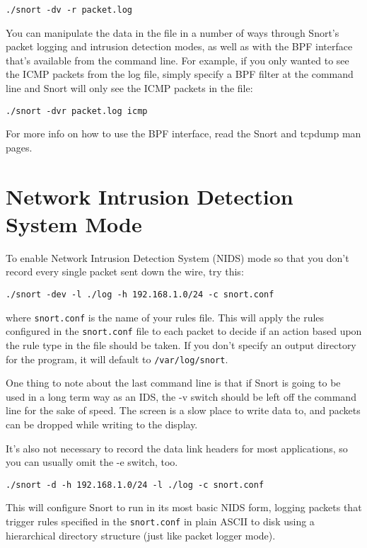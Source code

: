 \documentclass[english]{report}
\begin{document}
\begin{verbatim}
./snort -dv -r packet.log
\end{verbatim}
You can manipulate the data in the file in a number of ways through
Snort's packet logging and intrusion detection modes, as well as with
the BPF interface that's available from the command line. For example,
if you only wanted to see the ICMP packets from the log file, simply
specify a BPF filter at the command line and Snort will only see
the ICMP packets in the file:

\begin{verbatim}
./snort -dvr packet.log icmp 
\end{verbatim}
For more info on how to use the BPF interface, read the Snort and
tcpdump man pages.

\section{Network Intrusion Detection System Mode}

To enable Network Intrusion Detection System (NIDS) mode so that you don't
record every single packet sent down the wire, try this:

\begin{verbatim}
./snort -dev -l ./log -h 192.168.1.0/24 -c snort.conf
\end{verbatim}
where \texttt{snort.conf} is the name of your rules file. This will apply the
rules configured in the \verb!snort.conf! file to each packet to decide if an action
based upon the rule type in the file should be taken. If you don't
specify an output directory for the program, it will default to \verb!/var/log/snort!.

One thing to note about the last command line is that if Snort is
going to be used in a long term way as an IDS, the -v
switch should be left off the command line for the sake of speed.
The screen is a slow place to write data to, and packets can be dropped
while writing to the display.

It's also not necessary to record the data link headers for most applications,
so you can usually omit the -e switch, too.

\begin{verbatim}
./snort -d -h 192.168.1.0/24 -l ./log -c snort.conf
\end{verbatim}
This will configure Snort to run in its most basic NIDS form, logging
packets that trigger rules specified in the \texttt{snort.conf} in plain ASCII 
to disk using a hierarchical directory structure (just like packet logger mode). 
\end{document}
